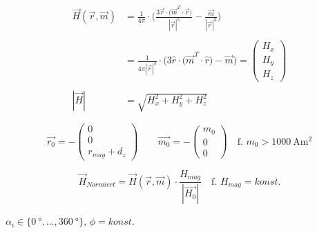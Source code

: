 \begin{align}
	\vec{H}(\vec{r},\vec{m}) &= \frac{1}{4\pi} \cdot \Bigg(\frac{3\vec{r} \cdot \big(\vec{m}^T \cdot \vec{r}\big)}{|\vec{r}|^5} - \frac{\vec{m}}{|\vec{r}|^3}\Bigg) \nonumber\\
							 \nonumber \\
							 &= \frac{1}{4\pi|\vec{r}|^3} \cdot \Big(3\hat{r} \cdot \big(\vec{m}^T \cdot \hat{r}\big) - \vec{m}\Big) = \begin{pmatrix} H_x \\ H_y \\ H_z \end{pmatrix} \\
						     \nonumber \\
				   |\vec{H}| &= \sqrt{ H_x^2 + H_y^2 + H_z^2 }
\end{align}




\begin{equation}
	\vec{r_0} = -\begin{pmatrix} 0 \\ 0 \\ r_{mag} + d_z \end{pmatrix} \qquad \vec{m_0} = -\begin{pmatrix} m_0\\0\\0 \end{pmatrix} \quad \textrm{f. } m_0 > \SI{1000}{\ampere\square\metre}
\end{equation}



\begin{equation}
	\vec{H}_{Normiert} = \vec{H}(\vec{r},\vec{m}) \cdot \frac{H_{mag}}{|\vec{H_0}|} \quad \textrm{f. } H_{mag} = konst.
\end{equation}


$\alpha_i\in\{\SI{0}{\degree},\ldots,\SI{360}{\degree}\}$, $\phi = konst.$


